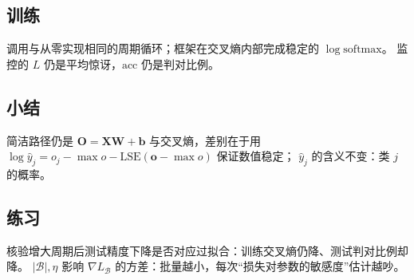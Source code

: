 \subsection{训练}

调用与从零实现相同的周期循环；框架在交叉熵内部完成稳定的 $\log\mathrm{softmax}$。
监控的 $L$ 仍是平均惊讶，$\mathrm{acc}$ 仍是判对比例。

\subsection{小结}

简洁路径仍是 $\bm{O}=\bm{X}\bm{W}+\bm{b}$ 与交叉熵，差别在于用
$\log\hat{y}_{j}=o_{j}-\max o-\mathrm{LSE}(\bm{o}-\max o)$ 保证数值稳定；
$\hat{y}_{j}$ 的含义不变：类 $j$ 的概率。

\subsection{练习}

核验增大周期后测试精度下降是否对应过拟合：训练交叉熵仍降、测试判对比例却降。
$|\mathcal{B}|,\eta$ 影响 $\nabla L_{\mathcal{B}}$ 的方差：批量越小，每次“损失对参数的敏感度”估计越吵。
